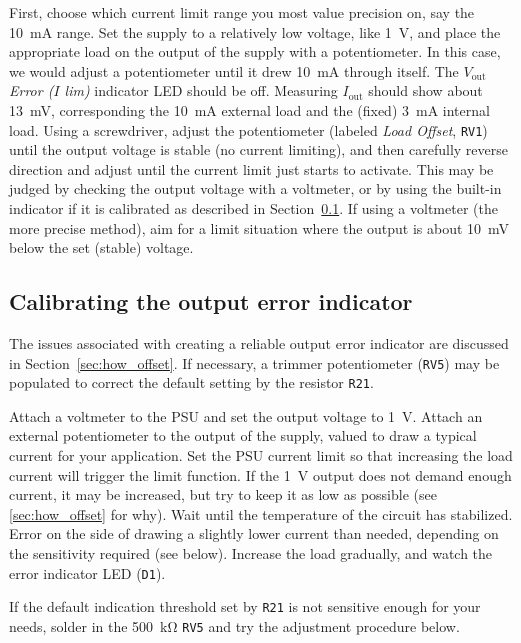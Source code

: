 \documentclass[letterpaper,twocolumn,11pt]{article}
\newcommand{\refdes}[1]{\texttt{#1}}
\begin{document}
First, choose which current limit range you most value precision on, say
the \SI{10}{\mA} range. Set the supply to a relatively low voltage, like
\SI{1}{\V}, and place the appropriate load on the output of the supply with a
potentiometer. In this case, we would adjust a potentiometer until it drew
\SI{10}{\mA} through itself. The \textit{$V_\text{out}$ Error ($I$ lim)}
indicator LED should be off. Measuring \textit{$I_\text{out}$} should show
about \SI{13}{\mV}, corresponding the \SI{10}{\mA} external load and the (fixed)
\SI{3}{\mA} internal load. Using a screwdriver, adjust the potentiometer (labeled \emph{Load
Offset}, \refdes{RV1}) until the output voltage is stable (no current limiting),
and then carefully reverse direction and adjust until the current limit just
starts to activate. This may be judged by checking the output voltage with a
voltmeter, or by using the built-in indicator if it is calibrated as described
in Section~\ref{sec:cal_offset}. If using a voltmeter (the more precise method),
aim for a limit situation where the output is about \SI{10}{\mV} below the set
(stable) voltage.

\subsection{Calibrating the output error indicator}\label{sec:cal_offset}

The issues associated with creating a reliable output error indicator are
discussed in Section~\ref{sec:how_offset}. If necessary, a trimmer potentiometer
(\refdes{RV5}) may be populated to correct the default setting by the resistor
\refdes{R21}.

Attach a voltmeter to the PSU and set the output voltage to \SI{1}{\V}. Attach
an external potentiometer to the output of the supply, valued to draw a typical
current for your application. Set the PSU current limit so that increasing the
load current will trigger the limit function. If the \SI{1}{\V} output does not
demand enough current, it may be increased, but try to keep it as low as
possible (see \ref{sec:how_offset} for why). Wait until the temperature of the
circuit has stabilized. Error on the side of drawing a slightly lower current
than needed, depending on the sensitivity required (see below). Increase the
load gradually, and watch the error indicator LED (\refdes{D1}).

If the default indication threshold set by \refdes{R21} is not sensitive enough
for your needs, solder in the \SI{500}{\kohm} \refdes{RV5} and try the
adjustment procedure below.
\end{document}
